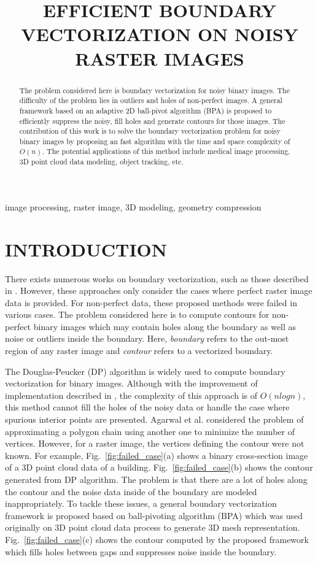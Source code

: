 \documentclass{article}
\title{EFFICIENT BOUNDARY VECTORIZATION ON NOISY RASTER IMAGES}
\newcommand{\Figa}[1]{Fig.~\ref{fig:#1}(a)}
\newcommand{\Figb}[1]{Fig.~\ref{fig:#1}(b)}
\newcommand{\Figc}[1]{Fig.~\ref{fig:#1}(c)}
\begin{document}
%
\maketitle
%
\begin{abstract}
The problem considered here is boundary vectorization
for noisy binary images. The difficulty of the problem lies in
outliers and holes of non-perfect images. A general framework based
on an adaptive 2D ball-pivot algorithm (BPA) is proposed to efficiently suppress
the noisy, fill holes and generate contours for those images.
The contribution of this work is to solve the boundary vectorization problem for noisy binary images
by proposing an fast algorithm with the time and space complexity of $O(n)$.
The potential applications of this method include medical
image processing, 3D point cloud data modeling, object tracking, etc.
\end{abstract}
%
\begin{keywords}
image processing, raster image, 3D modeling, geometry compression
\end{keywords}
%
\section{INTRODUCTION}
\label{sec:intro}


There exists numerous works on boundary vectorization,
such as those described in \cite{DP_RP,DP_LC,DP_AAKMT}.
However, these approaches
only consider the cases where perfect raster image data is provided.
For non-perfect data, these proposed methods were failed in various cases.
The problem considered here is to compute contours
for non-perfect binary images which may contain holes
along the boundary as well as noise or outliers
inside the boundary. Here, {\it boundary} refers to the
out-most region of any raster image and
{\it contour} refers to a vectorized boundary.


The Douglas-Peucker (DP) algorithm \cite{DP_DP} is widely used
to compute boundary vectorization for binary images.
Although  with the improvement of implementation described in \cite{DP_HS, DP_HS94},
the complexity of this approach is of $O(nlogn)$, this method cannot fill the
holes of the noisy data or handle the case
where spurious interior points are presented.
Agarwal et al. \cite{DP_AV} considered the problem of
approximating a polygon chain using another one to minimize the number of
vertices. However, for a raster image, the vertices
defining the contour were not known.
For example, \Figa{failed_case} shows a binary cross-section
image of a 3D point cloud data of a building. \Figb{failed_case} shows
the contour generated from DP algorithm. The problem is that there are
a lot of holes along the contour and the noise data inside of the
boundary are modeled inappropriately.
To tackle these issues, a general boundary vectorization framework is proposed
based on ball-pivoting algorithm (BPA) \cite{BPA_BMRS} which was used
originally on 3D point cloud data process to generate 3D mesh representation.
\Figc{failed_case} shows
the contour computed by the proposed framework which fills holes between gaps
and suppresses noise inside the boundary.
\end{document}
